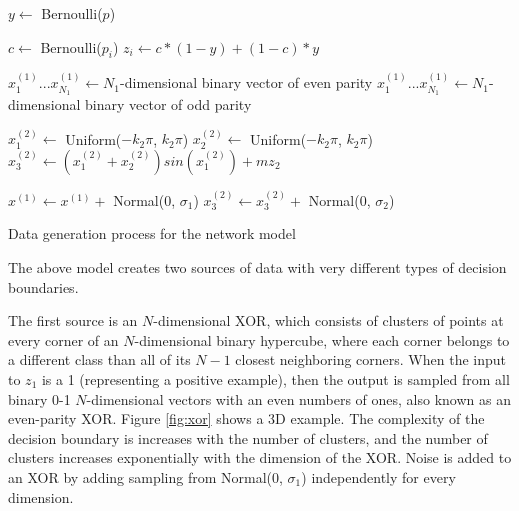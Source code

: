 \documentclass{article}
\begin{document}
\begin{algorithm}
\centering
\begin{algorithmic}[1]
    \item[] 
    \State $y \leftarrow$ Bernoulli($p$)

    \item[]
    \item[] 
        \State $c \leftarrow$ Bernoulli($p_i$) 
        \State $z_i \leftarrow c * (1-y) + (1-c) * y$ 
    \EndFor

    \item[]
    \item[] 
        \State $x^{(1)}_1 ... x^{(1)}_{N_1} \leftarrow N_1$-dimensional binary
        vector of even parity
    \Else
        \State $x^{(1)}_1 ... x^{(1)}_{N_1} \leftarrow N_1$-dimensional binary
        vector of odd parity
    \EndIf

    \item[]
    \item[] 
    \State $x^{(2)}_1 \leftarrow $ Uniform($-k_2\pi$, $k_2\pi$)
    \State $x^{(2)}_2 \leftarrow $ Uniform($-k_2\pi$, $k_2\pi$)
    \State $x^{(2)}_3 \leftarrow (x^{(2)}_1+x^{(2)}_2)sin(x^{(2)}_1) + mz_2$

    \item[]
    \item[] 
    \State $x^{(1)} \leftarrow x^{(1)} + $ Normal(0, $\sigma_1$)
    \State $x^{(2)}_3 \leftarrow x^{(2)}_3 + $ Normal(0, $\sigma_2$)
\end{algorithmic}
\caption{Data generation process for the network model}
\label{alg:network_model}
\end{algorithm}


The above model creates two sources of data with very different types of
decision boundaries.

The first source is an $N$-dimensional XOR, which consists of clusters of
points at every corner of an $N$-dimensional binary hypercube, where each
corner belongs to a different class than all of its $N-1$ closest neighboring
corners. When the input to $z_1$ is a 1 (representing a positive example), then
the output is sampled from all binary 0-1 $N$-dimensional vectors with an even
numbers of ones, also known as an even-parity XOR. Figure \ref{fig:xor} shows a
3D example. The complexity of the decision boundary is increases with the
number of clusters, and the number of clusters increases exponentially with the
dimension of the XOR. Noise is added to an XOR by adding sampling from
Normal(0, $\sigma_1$) independently for every dimension.
\end{document}
